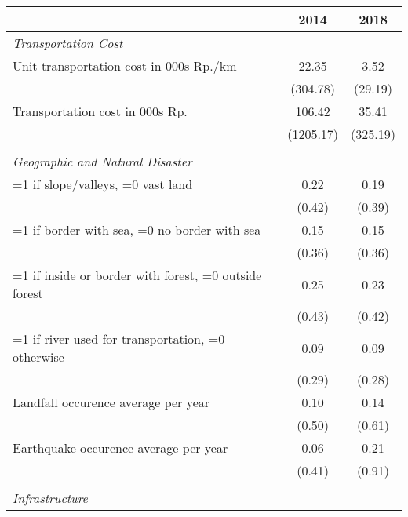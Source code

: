 \begin{tabular}{l*{2}{c}}
\hline\hline
                    &        2014&        2018\\
\hline
\emph{Transportation Cost}&            &            \\
\hspace{0.25cm} Unit transportation cost in 000s Rp./km&       22.35&        3.52\\
                    &    (304.78)&     (29.19)\\
\hspace{0.25cm} Transportation cost in 000s Rp.&      106.42&       35.41\\
                    &   (1205.17)&    (325.19)\\
\vspace{0.1em} \\ \emph{Geographic and Natural Disaster}&            &            \\
\hspace{0.25cm} =1 if slope/valleys, =0 vast land&        0.22&        0.19\\
                    &      (0.42)&      (0.39)\\
\hspace{0.25cm} =1 if border with sea, =0 no border with sea&        0.15&        0.15\\
                    &      (0.36)&      (0.36)\\
\hspace{0.25cm} =1 if inside or border with forest, =0 outside forest&        0.25&        0.23\\
                    &      (0.43)&      (0.42)\\
\hspace{0.25cm} =1 if river used for transportation, =0 otherwise&        0.09&        0.09\\
                    &      (0.29)&      (0.28)\\
\hspace{0.25cm} Landfall occurence average per year&        0.10&        0.14\\
                    &      (0.50)&      (0.61)\\
\hspace{0.25cm} Earthquake occurence average per year&        0.06&        0.21\\
                    &      (0.41)&      (0.91)\\
\vspace{0.1em} \\ \emph{Infrastructure}&            &            \\

\end{tabular}
